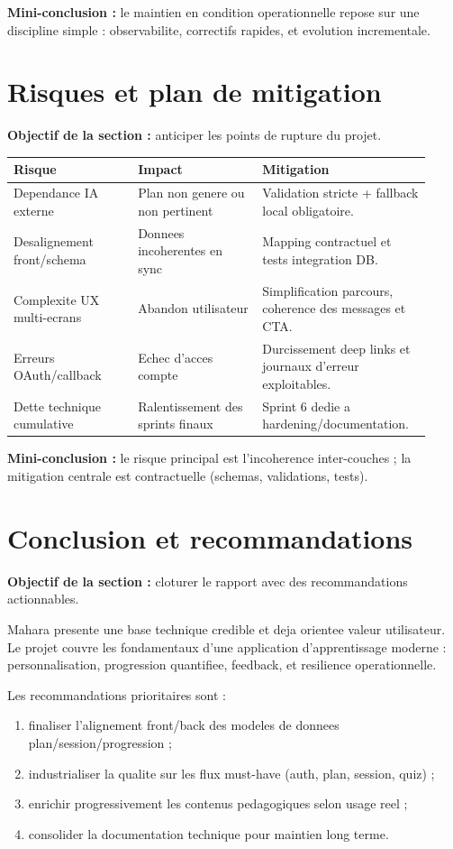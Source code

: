 \documentclass[12pt,a4paper]{article}
\begin{document}
\textbf{Mini-conclusion :} le maintien en condition operationnelle repose sur une discipline simple : observabilite, correctifs rapides, et evolution incrementale.

\section{Risques et plan de mitigation}
\textbf{Objectif de la section :} anticiper les points de rupture du projet.

\begin{longtable}{p{0.28\linewidth}p{0.28\linewidth}p{0.36\linewidth}}
\toprule
\textbf{Risque} & \textbf{Impact} & \textbf{Mitigation} \\
\midrule
Dependance IA externe & Plan non genere ou non pertinent & Validation stricte + fallback local obligatoire. \\
Desalignement front/schema & Donnees incoherentes en sync & Mapping contractuel et tests integration DB. \\
Complexite UX multi-ecrans & Abandon utilisateur & Simplification parcours, coherence des messages et CTA. \\
Erreurs OAuth/callback & Echec d'acces compte & Durcissement deep links et journaux d'erreur exploitables. \\
Dette technique cumulative & Ralentissement des sprints finaux & Sprint 6 dedie a hardening/documentation. \\
\bottomrule
\end{longtable}

\textbf{Mini-conclusion :} le risque principal est l'incoherence inter-couches ; la mitigation centrale est contractuelle (schemas, validations, tests).

\section{Conclusion et recommandations}
\textbf{Objectif de la section :} cloturer le rapport avec des recommandations actionnables.

Mahara presente une base technique credible et deja orientee valeur utilisateur. Le projet couvre les fondamentaux d'une application d'apprentissage moderne : personnalisation, progression quantifiee, feedback, et resilience operationnelle.

Les recommandations prioritaires sont :
\begin{enumerate}
  \item finaliser l'alignement front/back des modeles de donnees plan/session/progression ;
  \item industrialiser la qualite sur les flux must-have (auth, plan, session, quiz) ;
  \item enrichir progressivement les contenus pedagogiques selon usage reel ;
  \item consolider la documentation technique pour maintien long terme.
\end{enumerate}
\end{document}
